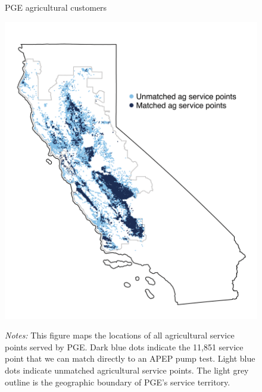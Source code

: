 
\begin{figure}[h!]\centering
\captionsetup{width=\textwidth}
\caption{PGE agricultural customers}
\label{fig:pge_ca_map}
\vspace{-2mm}
{\includegraphics[width=.8\textwidth, trim={2mm 20mm 2mm 45mm}, clip]{figures/pge_ca_map.png}}\\
\captionsetup{width=.85\textwidth}
\caption*{\scriptsize \emph{Notes:} This figure maps the locations of all agricultural service points served by PGE. Dark blue dots indicate the 11,851 service point that we can match directly to an APEP pump test. Light blue dots indicate unmatched agricultural service points. The light grey outline is the geographic boundary of PGE's service territory. }
\end{figure}